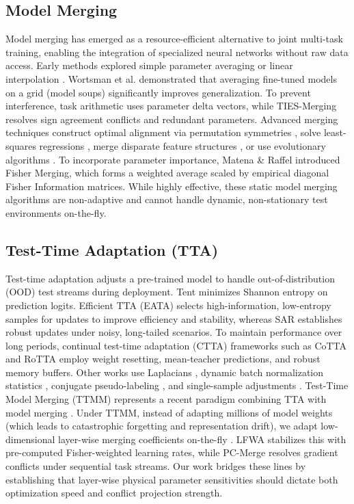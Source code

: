 \documentclass{article}
\theoremstyle{plain}
\theoremstyle{definition}
\theoremstyle{remark}
\begin{document}
\subsection{Model Merging}
Model merging has emerged as a resource-efficient alternative to joint multi-task training, enabling the integration of specialized neural networks without raw data access. Early methods explored simple parameter averaging or linear interpolation \cite{git_rebasin}. Wortsman et al. \cite{model_soups} demonstrated that averaging fine-tuned models on a grid (model soups) significantly improves generalization. To prevent interference, task arithmetic \cite{task_arithmetic} uses parameter delta vectors, while TIES-Merging \cite{ties_merge} resolves sign agreement conflicts and redundant parameters. Advanced merging techniques construct optimal alignment via permutation symmetries \cite{git_rebasin}, solve least-squares regressions \cite{regmean}, merge disparate feature structures \cite{zipit}, or use evolutionary algorithms \cite{evolutionary_merge}. To incorporate parameter importance, Matena \& Raffel \cite{fisher_merging} introduced Fisher Merging, which forms a weighted average scaled by empirical diagonal Fisher Information matrices. While highly effective, these static model merging algorithms are non-adaptive and cannot handle dynamic, non-stationary test environments on-the-fly.

\subsection{Test-Time Adaptation (TTA)}
Test-time adaptation adjusts a pre-trained model to handle out-of-distribution (OOD) test streams during deployment. Tent \cite{tent} minimizes Shannon entropy on prediction logits. Efficient TTA (EATA) \cite{eata} selects high-information, low-entropy samples for updates to improve efficiency and stability, whereas SAR \cite{sar} establishes robust updates under noisy, long-tailed scenarios. To maintain performance over long periods, continual test-time adaptation (CTTA) frameworks such as CoTTA \cite{cotta} and RoTTA \cite{rotta} employ weight resetting, mean-teacher predictions, and robust memory buffers. Other works use Laplacians \cite{lame}, dynamic batch normalization statistics \cite{dua}, conjugate pseudo-labeling \cite{conjugate_pl}, and single-sample adjustments \cite{memo, note}. Test-Time Model Merging (TTMM) represents a recent paradigm combining TTA with model merging \cite{adamerging}. Under TTMM, instead of adapting millions of model weights (which leads to catastrophic forgetting and representation drift), we adapt low-dimensional layer-wise merging coefficients on-the-fly \cite{s2c_merge, cpa_merge}. LFWA \cite{lfwa} stabilizes this with pre-computed Fisher-weighted learning rates, while PC-Merge \cite{pc_merge} resolves gradient conflicts under sequential task streams. Our work bridges these lines by establishing that layer-wise physical parameter sensitivities should dictate both optimization speed and conflict projection strength.
\end{document}
